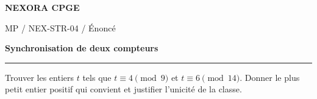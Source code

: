 \documentclass[11pt,a4paper]{article}
\begin{document}
{\small\bfseries\color{nexorablue} NEXORA CPGE}\par
{\small MP / NEX-STR-04 / Énoncé}\par
{\LARGE\bfseries Synchronisation de deux compteurs}\par
\vspace{0.25em}\hrule\vspace{0.6em}

Trouver les entiers $t$ tels que $t\equiv4\pmod9$ et $t\equiv6\pmod{14}$. Donner le plus petit entier positif qui convient et justifier l’unicité de la classe.
\end{document}
